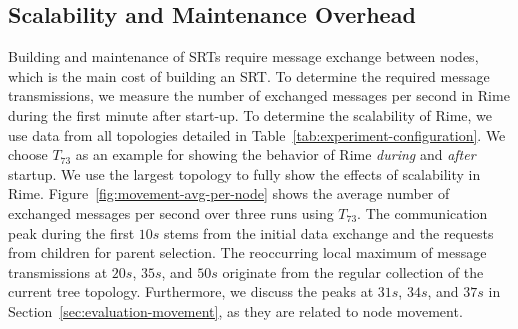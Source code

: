\subsection{Scalability and Maintenance Overhead}
\label{sec:evaluation-scalability-and-maintenance}
%
Building and maintenance of SRTs require message exchange between nodes, which is the main cost of building an SRT. To determine the required message transmissions, we measure the number of exchanged messages per second in Rime during the first minute after start-up. To determine the scalability of Rime, we use data from all topologies detailed in Table~\ref{tab:experiment-configuration}. We choose $T_{73}$ as an example for showing the behavior of Rime \textit{during} and \textit{after} startup. We use the largest topology to fully show the effects of scalability in Rime. Figure~\ref{fig:movement-avg-per-node} shows the average number of exchanged messages per second over three runs using $T_{73}$.
The communication peak during the first $10s$ stems from the initial data exchange and the requests from children for parent selection. The reoccurring local maximum of message transmissions at $20s$, $35s$, and $50s$ originate from the regular collection of the current tree topology. 
Furthermore, we discuss the peaks at $31s$, $34s$, and $37s$ in Section~\ref{sec:evaluation-movement}, as they are related to node movement.

